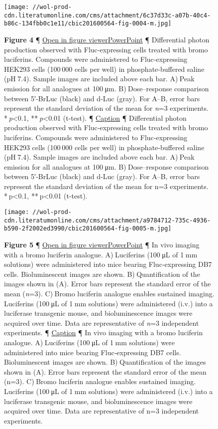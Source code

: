 \begin{figure}
\centering
\texttt{[image: //wol-prod-cdn.literatumonline.com/cms/attachment/6c37d33c-a07b-40c4-b86c-134fbb0c1e11/cbic201600564-fig-0004-m.jpg]}
\caption{\textbf{Figure 4} ¶ \protect\hyperlink{}{Open in figure
viewer}\href{/action/downloadFigures?id=cbic201600564-fig-0004\&doi=10.1002\%2Fcbic.201600564}{PowerPoint}
¶ Differential photon production observed with Fluc‐expressing cells
treated with bromo luciferins. Compounds were administered to
Fluc‐expressing HEK293 cells (100 000 cells per well) in
phosphate‐buffered saline (pH 7.4). Sample images are included above
each bar. A) Peak emission for all analogues at 100 μ{m}.
B) Dose--response comparison between 5′‐BrLuc (black) and {d}‐Luc
(gray). For A--B, error bars represent the standard deviation of the
mean for \emph{n}=3 experiments. * \emph{p}\textless{}0.1,
** \emph{p}\textless{}0.01 (t‐test). ¶
\protect\hyperlink{}{{Caption}\emph{}} ¶ Differential photon production
observed with Fluc‐expressing cells treated with bromo luciferins.
Compounds were administered to Fluc‐expressing HEK293 cells (100 000
cells per well) in phosphate‐buffered saline (pH 7.4). Sample images are
included above each bar. A) Peak emission for all analogues at 100 μm.
B) Dose--response comparison between 5′‐BrLuc (black) and d‐Luc (gray).
For A--B, error bars represent the standard deviation of the mean for
n=3 experiments. * p\textless{}0.1, ** p\textless{}0.01 (t‐test).}
\end{figure}

\begin{figure}
\centering
\texttt{[image: //wol-prod-cdn.literatumonline.com/cms/attachment/a9784712-735c-4936-b590-2f2002ed3990/cbic201600564-fig-0005-m.jpg]}
\caption{\textbf{Figure 5} ¶ \protect\hyperlink{}{Open in figure
viewer}\href{/action/downloadFigures?id=cbic201600564-fig-0005\&doi=10.1002\%2Fcbic.201600564}{PowerPoint}
¶ In vivo imaging with a bromo luciferin analogue. A) Luciferins (100 μL
of 1 m{m} solutions) were administered into mice bearing Fluc‐expressing
DB7 cells. Bioluminescent images are shown. B) Quantification of the
images shown in (A). Error bars represent the standard error of the mean
(\emph{n}=3). C) Bromo luciferin analogue enables sustained imaging.
Luciferins (100 μL of 1 m{m} solutions) were administered (i.v.) into a
luciferase transgenic mouse, and bioluminescence images were acquired
over time. Data are representative of \emph{n}=3 independent
experiments. ¶ \protect\hyperlink{}{{Caption}\emph{}} ¶ In vivo imaging
with a bromo luciferin analogue. A) Luciferins (100 μL of 1 mm
solutions) were administered into mice bearing Fluc‐expressing DB7
cells. Bioluminescent images are shown. B) Quantification of the images
shown in (A). Error bars represent the standard error of the mean (n=3).
C) Bromo luciferin analogue enables sustained imaging. Luciferins
(100 μL of 1 mm solutions) were administered (i.v.) into a luciferase
transgenic mouse, and bioluminescence images were acquired over time.
Data are representative of n=3 independent experiments.}
\end{figure}


